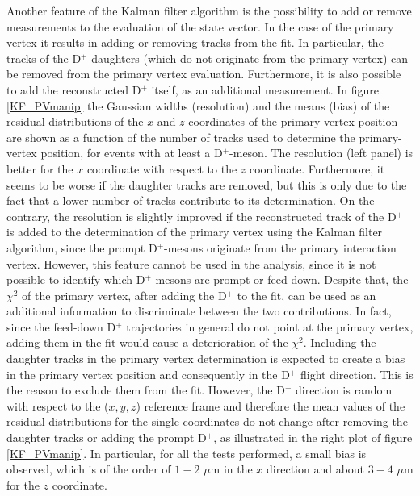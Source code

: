 \documentclass[b5paper,10pt,twoside,oldstyle,classica]{toptesi}
\begin{document}
Another feature of the Kalman filter algorithm is the possibility to add or remove measurements to the evaluation of the state vector. In the case of the primary vertex it results in adding or removing tracks from the fit. In particular, the tracks of the D$^+$ daughters (which do not originate from the primary vertex) can be removed from the primary vertex evaluation. Furthermore, it is also possible to add the reconstructed D$^+$ itself, as an additional measurement. In figure \ref{KF_PVmanip} the Gaussian widths (resolution) and the means (bias) of the residual distributions of the $x$ and $z$ coordinates of the primary vertex position are shown as a function of the number of tracks used to determine the primary-vertex position, for events with at least a D$^+$-meson. The resolution (left panel) is better for the $x$ coordinate with respect to the $z$ coordinate. Furthermore, it seems to be worse if the daughter tracks are removed, but this is only due to the fact that a lower number of tracks contribute to its determination. On the contrary, the resolution is slightly improved if the reconstructed track of the D$^+$ is added to the determination of the primary vertex using the Kalman filter algorithm, since the prompt D$^+$-mesons originate from the primary interaction vertex. However, this feature cannot be used in the analysis, since it is not possible to identify which D$^+$-mesons are prompt or feed-down. Despite that, the $\chi^2$ of the primary vertex, after adding the D$^+$ to the fit, can be used as an additional information to discriminate between the two contributions. In fact, since the feed-down D$^+$ trajectories in general do not point at the primary vertex, adding them in the fit would cause a deterioration of the $\chi^2$. Including the daughter tracks in the primary vertex determination is expected to create a bias in the primary vertex position and consequently in the D$^+$ flight direction. This is the reason to exclude them from the fit. However, the D$^+$ direction is random with respect to the ($x,y,z$) reference frame and therefore the mean values of the residual distributions for the single coordinates do not change after removing the daughter tracks or adding the prompt D$^+$, as illustrated in the right plot of figure \ref{KF_PVmanip}. In particular, for all the tests performed, a small bias is observed, which is of the order of $1-2$ $\mu$m in the $x$ direction and about $3-4$ $\mu$m for the $z$ coordinate. 
\end{document}
